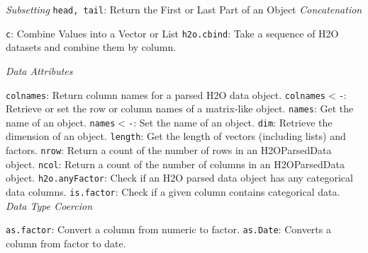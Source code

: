 {{\emph{Subsetting} 
\medskip
{\texttt{head, tail}}: Return the First or Last Part of an Object 
\medskip
\emph{Concatenation}\par
 {\texttt{c}}: Combine Values into a Vector or List %
 {\texttt{h2o.cbind}}: Take a sequence of H2O datasets and combine them by column.\par
\medskip
{\emph{Data Attributes}}\par
{\texttt{colnames}}: Return column names for a parsed H2O data object.  
{\texttt{colnames$<$-}}: Retrieve or set the row or column names of a matrix-like object. 
{\texttt{names}}: Get the name of an object.  
{\texttt{names$<$-}}: Set the name of an object.  
{\texttt{dim}}: Retrieve the dimension of an object.  
{\texttt{length}}: Get the length of vectors (including lists) and factors.  
{\texttt{nrow}}: Return a count of the number of rows in an H2OParsedData object.  
{\texttt{ncol}}: Return a count of the number of columns in an H2OParsedData object. 
{\texttt{h2o.anyFactor}}: Check if an H2O parsed data object has any categorical data columns.  
{\texttt{is.factor}}: Check if a given column contains categorical data. 
\medskip
{\emph{Data Type Coercion}}\par
{\texttt{as.factor}}: Convert a column from numeric to factor. 
{\texttt{as.Date}}: Converts a column from factor to date. 

}}
